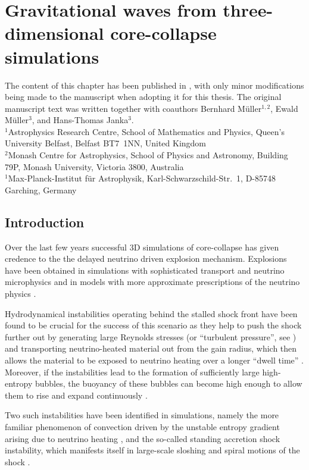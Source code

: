 \chapter{Gravitational waves from three-dimensional core-collapse simulations} \label{ch:paper1}
The content of this chapter has been published in \cite{andresen_16}, with only minor modifications
being made to the manuscript when adopting it for this thesis. The original manuscript text
was written together with coauthors Bernhard M\"uller$^{1,2}$, Ewald M\"uller$^{3}$, and Hans-Thomas Janka$^{3}$.\\
{\tiny
$^{1}$Astrophysics Research Centre, School of
   Mathematics and Physics, Queen's University Belfast, Belfast BT7~1NN, United Kingdom\\
$^{2}$Monash Centre for Astrophysics, School of
   Physics and Astronomy, Building 79P, Monash University, Victoria
   3800, Australia
\\
$^{1}$Max-Planck-Institut f\"ur Astrophysik,
   Karl-Schwarzschild-Str.~1, D-85748 Garching, Germany
}
\section{Introduction}
Over the last few years successful 3D simulations of core-collapse 
has given credence to the the delayed neutrino driven explosion mechanism.
Explosions have been obtained in simulations with sophisticated
transport and neutrino microphysics \citep{melson_15a,melson_15b,lentz_15,suma_models} and
in models with more approximate prescriptions of the neutrino physics 
\citep{takiwaki_12,takiwaki_14,mueller_15b,roberts_16}.

Hydrodynamical instabilities operating behind the stalled shock front
have been found to be crucial for the success of this scenario as they
help to push the shock further out by generating large Reynolds
stresses (or ``turbulent pressure'', see \citealp{burrows_95,murphy_12,couch_15,mueller_15a})
and transporting neutrino-heated material out from the gain radius, which then
allows the material to be exposed to neutrino heating over a longer
``dwell time'' \citep{buras_06b,murphy_08b}. Moreover, if the
instabilities lead to the formation of sufficiently large high-entropy
bubbles, the buoyancy of these bubbles can become high enough to
allow them to rise and expand continuously
\citep{thompson_00,dolence_13,fernandez_15}. 

Two such instabilities have been identified in simulations,
namely the more familiar phenomenon of convection driven by the 
unstable entropy gradient arising due to neutrino heating
\citep{bethe_90,herant_94,burrows_95,janka_96,mueller_97}, and the
so-called standing accretion shock instability, which manifests
itself in large-scale sloshing and spiral motions of the shock
\citep{blondin_03,blondin_06,foglizzo_07,ohnishi_06,ohnishi_08,scheck_08,guilet_12,foglizzo_15}.

